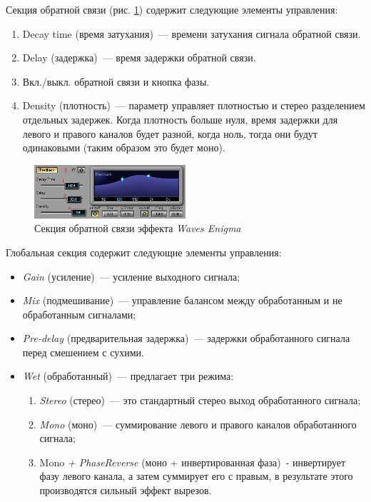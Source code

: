 \documentclass[oneside, final, 14pt]{extreport}
\begin{document}
 Секция обратной связи (рис. \ref{pic-enigma-04}) содержит следующие элементы управления:
 \begin{enumerate}
   \item Decay time (время затухания)~--- времени затухания сигнала обратной связи.
   \item Delay (задержка)~--- время задержки обратной связи.
   \item Вкл./выкл. обратной связи и кнопка фазы.
   \item Density (плотность)~--- параметр управляет плотностью и стерео разделением отдельных задержек. Когда плотность больше нуля, время задержки для левого и правого каналов будет разной, когда ноль, тогда они будут одинаковыми (таким образом это будет моно).
 \end{enumerate}

\begin{figure}[h!]
  \centering
  \includegraphics[width=0.5\textwidth]{pic-enigma-04}
  \caption{Секция обратной связи эффекта \emph{Waves Enigma}}
  \label{pic-enigma-04}
\end{figure}

Глобальная секция содержит следующие элементы управления:
\begin{itemize}
  \item \emph{Gain} (усиление)~--- усиление выходного сигнала;
  \item \emph{Mix} (подмешивание)~--- управление балансом между обработанным и не обработанным сигналами;
  \item \emph{Pre-delay} (предварительная задержка)~--- задержки обработанного сигнала перед смешением с сухими.
  \item \emph{Wet} (обработанный)~--- предлагает три режима:
  \begin{enumerate}
    \item \emph{Stereo} (стерео)~--- это стандартный стерео выход обработанного сигнала;
    \item \emph{Mono} (моно)~--- суммирование левого и правого каналов обработанного сигнала;
    \item Mono\emph{ + PhaseReverse} (моно + инвертированная фаза)~- инвертирует фазу левого канала, а затем суммирует его с правым, в результате этого производятся сильный эффект вырезов.
  \end{enumerate}
\end{itemize}
\end{document}
